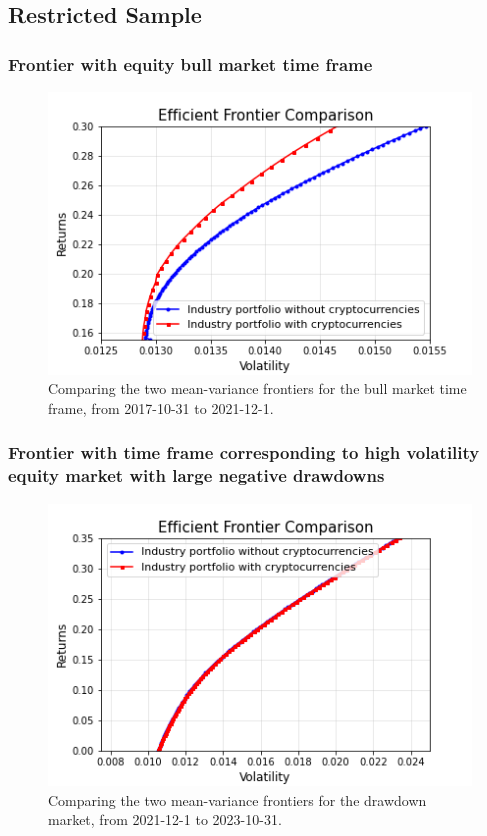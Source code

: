 \documentclass[12pt,a4paper]{article}
\begin{document}
\subsection{Restricted Sample}\label{sec:restricted sample}
\subsubsection{Frontier with equity bull market time frame}
\begin{figure}[H]
    \centering
    \includegraphics[width=0.8\linewidth]{Figures/Efficient_Frontier_Comparison_Bull_Market.png}
    \caption{Comparing the two mean-variance frontiers for the bull market time frame, from 2017-10-31 to 2021-12-1.}
    \label{fig:bull}
\end{figure}

\subsubsection{Frontier with time frame corresponding to high volatility equity market with large negative drawdowns}
\begin{figure}[H]
    \centering
    \includegraphics[width=0.8\linewidth]{Figures/Efficient_Frontier_Comparison_Drawdown_Market.png}
    \caption{Comparing the two mean-variance frontiers for the drawdown market, from 2021-12-1 to 2023-10-31.}
    \label{fig:drawdown}
\end{figure}
\end{document}
